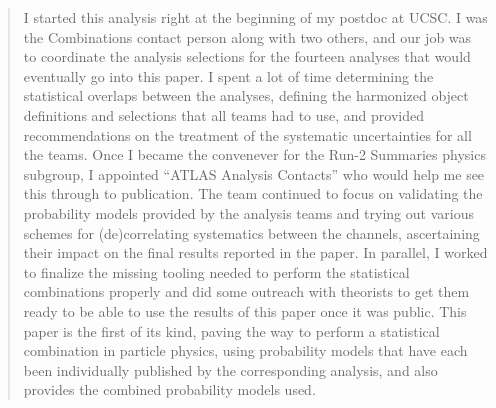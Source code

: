 \begin{quotation}
	I started this analysis right at the beginning of my postdoc at UCSC.
	I was the Combinations contact person along with two others, and our job was to coordinate the analysis selections for the fourteen analyses that would eventually go into this paper.
	I spent a lot of time determining the statistical overlaps between the analyses, defining the harmonized object definitions and selections that all teams had to use, and provided recommendations on the treatment of the systematic uncertainties for all the teams.
	Once I became the convenever for the Run-2 Summaries physics subgroup, I appointed \enquote{ATLAS Analysis Contacts} who would help me see this through to publication.
	The team continued to focus on validating the probability models provided by the analysis teams and trying out various schemes for (de)correlating systematics between the channels, ascertaining their impact on the final results reported in the paper.
	In parallel, I worked to finalize the missing tooling needed to perform the statistical combinations properly and did some outreach with theorists to get them ready to be able to use the results of this paper once it was public.
	This paper is the first of its kind, paving the way to perform a statistical combination in particle physics, using probability models that have each been individually published by the corresponding analysis, and also provides the combined probability models used.
\end{quotation}


